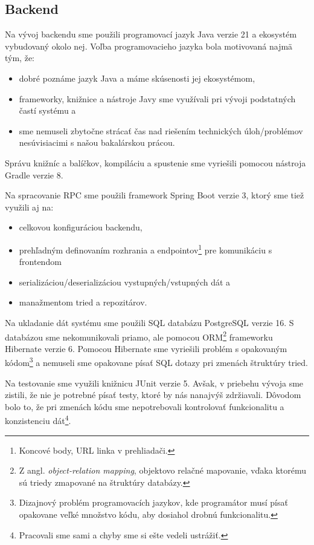 \subsection*{Backend}
Na vývoj backendu sme použili programovací jazyk Java verzie 21 a ekosystém vybudovaný okolo nej. Voľba programovacieho jazyka
bola motivovaná najmä tým, že:
\begin{itemize}
  \item dobré poznáme jazyk Java a máme skúsenosti jej ekosystémom,
  \item frameworky, knižnice a nástroje Javy sme využívali pri vývoji podstatných častí systému a
  \item sme nemuseli zbytočne strácať čas nad riešením technických úloh/problémov nesúvisiacimi s našou bakalárskou prácou.
\end{itemize}

Správu knižníc a balíčkov, kompiláciu a spustenie sme vyriešili pomocou nástroja Gradle verzie 8.

Na spracovanie RPC sme použili framework Spring Boot verzie 3, ktorý sme tiež využili aj na:
\begin{itemize}
  \item celkovou konfiguráciou backendu,
  \item prehľadným definovaním rozhrania a endpointov\footnote{Koncové body, \acrshort{URL} linka v prehliadači.} pre
    komunikáciu s frontendom
  \item serializáciou/deserializáciou vystupných/vstupných dát a
  \item manažmentom tried a repozitárov.
\end{itemize}

Na ukladanie dát systému sme použili SQL databázu PostgreSQL verzie 16. S databázou sme nekomunikovali priamo, ale pomocou
\acrshort{ORM}\footnote{Z angl. \textit{object-relation mapping}, objektovo relačné mapovanie, vďaka ktorému sú triedy zmapované
na štruktúry databázy.} frameworku Hibernate verzie 6. Pomocou Hibernate sme vyriešili problém s opakovaným kódom\footnote{Dizajnový
problém programovacích jazykov, kde programátor musí písať opakovane veľké množstvo kódu, aby dosiahol drobnú funkcionalitu.}
a nemuseli sme opakovane písať \acrshort{SQL} dotazy pri zmenách štruktúry tried.

Na testovanie sme využili knižnicu JUnit verzie 5. Avšak, v priebehu vývoja sme zistili, že nie je potrebné písať testy,
ktoré by nás nanajvýš zdržiavali. Dôvodom bolo to, že pri zmenách kódu sme nepotrebovali kontrolovať funkcionalitu a 
konzistenciu dát\footnote{Pracovali sme sami a chyby sme si ešte vedeli ustrážiť.}.

